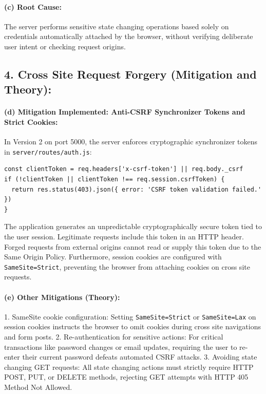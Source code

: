 \documentclass[11pt,a4paper]{article}
\begin{document}
\paragraph*{(c) Root Cause:}
The server performs sensitive state changing operations based solely on credentials automatically attached by the browser, without verifying deliberate user intent or checking request origins.

\clearpage

\subsection*{4. Cross Site Request Forgery (Mitigation and Theory):}

\paragraph*{(d) Mitigation Implemented: Anti-CSRF Synchronizer Tokens and Strict Cookies:}
In Version 2 on port 5000, the server enforces cryptographic synchronizer tokens in \texttt{server/routes/auth.js}:
\begin{lstlisting}
const clientToken = req.headers['x-csrf-token'] || req.body._csrf
if (!clientToken || clientToken !== req.session.csrfToken) {
  return res.status(403).json({ error: 'CSRF token validation failed.' })
}
\end{lstlisting}
The application generates an unpredictable cryptographically secure token tied to the user session. Legitimate requests include this token in an HTTP header. Forged requests from external origins cannot read or supply this token due to the Same Origin Policy. Furthermore, session cookies are configured with \texttt{SameSite=Strict}, preventing the browser from attaching cookies on cross site requests.

\paragraph*{(e) Other Mitigations (Theory):}
1. SameSite cookie configuration: Setting \texttt{SameSite=Strict} or \texttt{SameSite=Lax} on session cookies instructs the browser to omit cookies during cross site navigations and form posts.
2. Re-authentication for sensitive actions: For critical transactions like password changes or email updates, requiring the user to re-enter their current password defeats automated CSRF attacks.
3. Avoiding state changing GET requests: All state changing actions must strictly require HTTP POST, PUT, or DELETE methods, rejecting GET attempts with HTTP 405 Method Not Allowed.
\end{document}
